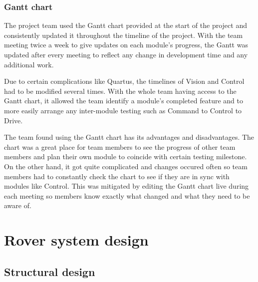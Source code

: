 \documentclass[11pt, a4paper]{article}
\begin{document}
\vfill
\pagebreak

\subsubsection{Gantt chart}

The project team used the Gantt chart provided at the start of the project and consistently updated it throughout the timeline of the project. With the team meeting twice a week to give updates on each module's progress, the Gantt was updated after every meeting to reflect any change in development time and any additional work. 

Due to certain complications like Quartus, the timelines of Vision and Control had to be modified several times. With the whole team having access to the Gantt chart, it allowed the team identify a module's completed feature and to more easily arrange any inter-module testing such as Command to Control to Drive.  

The team found using the Gantt chart has its advantages and disadvantages. The chart was a great place for team members to see the progress of other team members and plan their own module to coincide with certain testing milestone. On the other hand, it got quite complicated and changes occured often so team members had to constantly check the chart to see if they are in sync with modules like Control. This was mitigated by editing the Gantt chart live during each meeting so members know exactly what changed and what they need to be aware of.




\vfill






\pagebreak
\section{Rover system design}

\subsection{Structural design}
\end{document}
